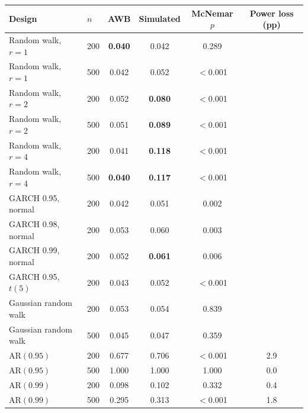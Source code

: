 \begin{tabular}{llcccc}
\toprule
Design & $n$ & AWB & Simulated & McNemar $p$ & Power loss (pp)\\
\midrule
Random walk, $r = 1$ & 200 & \textbf{0.040} & 0.042 & 0.289 &  \\
Random walk, $r = 1$ & 500 & 0.042 & 0.052 & $<$0.001 &  \\
Random walk, $r = 2$ & 200 & 0.052 & \textbf{0.080} & $<$0.001 &  \\
Random walk, $r = 2$ & 500 & 0.051 & \textbf{0.089} & $<$0.001 &  \\
Random walk, $r = 4$ & 200 & 0.041 & \textbf{0.118} & $<$0.001 &  \\
Random walk, $r = 4$ & 500 & \textbf{0.040} & \textbf{0.117} & $<$0.001 &  \\
GARCH 0.95, normal & 200 & 0.042 & 0.051 & 0.002 &  \\
GARCH 0.98, normal & 200 & 0.053 & 0.060 & 0.003 &  \\
GARCH 0.99, normal & 200 & 0.052 & \textbf{0.061} & 0.006 &  \\
GARCH 0.95, $t(5)$ & 200 & 0.043 & 0.052 & $<$0.001 &  \\
Gaussian random walk & 200 & 0.053 & 0.054 & 0.839 &  \\
Gaussian random walk & 500 & 0.045 & 0.047 & 0.359 &  \\
AR$(0.95)$ & 200 & 0.677 & 0.706 & $<$0.001 & 2.9 \\
AR$(0.95)$ & 500 & 1.000 & 1.000 & 1.000 & 0.0 \\
AR$(0.99)$ & 200 & 0.098 & 0.102 & 0.332 & 0.4 \\
AR$(0.99)$ & 500 & 0.295 & 0.313 & $<$0.001 & 1.8 \\
\bottomrule
\end{tabular}
